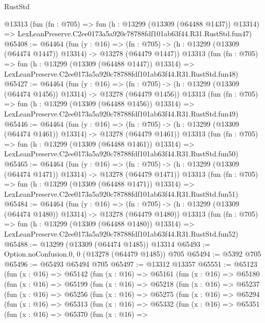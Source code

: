 \begin{lexlean}{RustStd}
\begin{coremodule}
    @13313
    (fun (fn : @705) =>
    fun (h : @13299 (@13309 (@64488 @1437)) @13314) =>
    LexLeanPreserve.C2ee0173a5a920c78788fdf101ab63f44.R31.RustStd.fun47)
@65408 := @64464
    (fun (y : @16) =>
    (fn : @705) -> (h : @13299 (@13309 (@64474 @1447)) @13314) -> @13278 (@64479 @1447))
    @13313
    (fun (fn : @705) =>
    fun (h : @13299 (@13309 (@64488 @1447)) @13314) =>
    LexLeanPreserve.C2ee0173a5a920c78788fdf101ab63f44.R31.RustStd.fun48)
@65427 := @64464
    (fun (y : @16) =>
    (fn : @705) -> (h : @13299 (@13309 (@64474 @1456)) @13314) -> @13278 (@64479 @1456))
    @13313
    (fun (fn : @705) =>
    fun (h : @13299 (@13309 (@64488 @1456)) @13314) =>
    LexLeanPreserve.C2ee0173a5a920c78788fdf101ab63f44.R31.RustStd.fun49)
@65446 := @64464
    (fun (y : @16) =>
    (fn : @705) -> (h : @13299 (@13309 (@64474 @1461)) @13314) -> @13278 (@64479 @1461))
    @13313
    (fun (fn : @705) =>
    fun (h : @13299 (@13309 (@64488 @1461)) @13314) =>
    LexLeanPreserve.C2ee0173a5a920c78788fdf101ab63f44.R31.RustStd.fun50)
@65465 := @64464
    (fun (y : @16) =>
    (fn : @705) -> (h : @13299 (@13309 (@64474 @1471)) @13314) -> @13278 (@64479 @1471))
    @13313
    (fun (fn : @705) =>
    fun (h : @13299 (@13309 (@64488 @1471)) @13314) =>
    LexLeanPreserve.C2ee0173a5a920c78788fdf101ab63f44.R31.RustStd.fun51)
@65484 := @64464
    (fun (y : @16) =>
    (fn : @705) -> (h : @13299 (@13309 (@64474 @1480)) @13314) -> @13278 (@64479 @1480))
    @13313
    (fun (fn : @705) =>
    fun (h : @13299 (@13309 (@64488 @1480)) @13314) =>
    LexLeanPreserve.C2ee0173a5a920c78788fdf101ab63f44.R31.RustStd.fun52)
@65488 := @13299 (@13309 (@64474 @1485)) @13314
@65493 := Option.noConfusion.{0, 0} (@13278 (@64479 @1485)) @705
@65494 := @5392 @705
@65496 := @65493 @65494 @705
@65497 := @13312 @13357
@65551 := @65123
    (fun (x : @16) =>
    @65142
      (fun (x : @16) =>
      @65161
        (fun (x : @16) =>
        @65180
          (fun (x : @16) =>
          @65199
            (fun (x : @16) =>
            @65218
              (fun (x : @16) =>
              @65237
                (fun (x : @16) =>
                @65256
                  (fun (x : @16) =>
                  @65275
                    (fun (x : @16) =>
                    @65294
                      (fun (x : @16) =>
                      @65313
                        (fun (x : @16) =>
                        @65332
                          (fun (x : @16) =>
                          @65351
                            (fun (x : @16) =>
                            @65370
                              (fun (x : @16) =>

\end{coremodule}
\end{lexlean}
